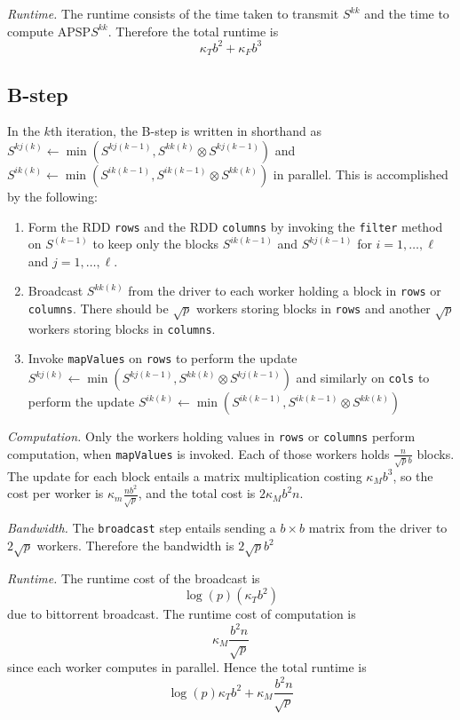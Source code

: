 \documentclass{article} %
\begin{document}
\emph{Runtime.}
The runtime consists of the time taken to transmit $S^{kk}$ and the time to compute $\text{APSP}S^{kk}$.
Therefore the total runtime is
\[
\kappa_T b^2 + \kappa_F b^3
\]

\subsection{B-step}
In the $k$th iteration, the B-step is written in shorthand as
 $S^{kj(k)} \leftarrow \min(S^{kj(k-1)}, S^{kk(k)} \otimes S^{kj(k-1)})$ 
and 
$S^{ik(k)} \leftarrow \min(S^{ik(k-1)}, S^{ik(k-1)} \otimes S^{kk(k)})$
 in parallel.
This is accomplished by the following:
\begin{enumerate}
\item Form the RDD {\tt rows} and the RDD {\tt columns} by invoking
  the {\tt filter} method on $S^{(k-1)}$ to keep only the blocks
  $S^{ik(k-1)}$ and $S^{kj(k-1)}$ for $i = 1,\hdots, \ell$ and $j =
  1,\hdots, \ell$.
\item Broadcast $S^{kk(k)}$ from the driver to each worker holding a
  block in {\tt rows} or {\tt columns}.  There should be $\sqrt{p}$
  workers storing blocks in {\tt rows} and another $\sqrt{p}$ workers
  storing blocks in {\tt columns}.
\item Invoke {\tt mapValues} on {\tt rows} to perform the update
  $S^{kj(k)} \leftarrow \min(S^{kj(k-1)}, S^{kk(k)} \otimes S^{kj(k-1)})$ and similarly
  on {\tt cols} to perform the update $S^{ik(k)} \leftarrow \min(S^{ik(k-1)}, S^{ik(k-1)}
  \otimes S^{kk(k)})$
\end{enumerate}

\emph{Computation.}  Only the workers holding values in {\tt rows} or
     {\tt columns} perform computation, when {\tt mapValues} is
     invoked.  Each of those workers holds $\frac{n}{\sqrt{p}b}$
     blocks.  The update for each block entails a matrix multiplication
     costing $\kappa_M b^3$, so the cost per worker is $\kappa_m
     \frac{nb^2}{\sqrt{p}}$, and the total cost is $2\kappa_M b^2 n$.

\emph{Bandwidth.} The {\tt broadcast} step entails sending a $b \times
b$ matrix from the driver to $2\sqrt{p}$ workers.  Therefore the
bandwidth is $2\sqrt{p}b^2$

\emph{Runtime.} The runtime cost of the broadcast is
\[
\log(p)(\kappa_T b^2)
\]
due to bittorrent broadcast.
The runtime cost of computation is
\[
\kappa_M \frac{b^2 n}{\sqrt{p}}
\]
since each worker computes in parallel.
Hence the total runtime is
\[
\log(p)\kappa_T b^2 + \kappa_M \frac{b^2 n}{\sqrt{p}}
\]
\end{document}

